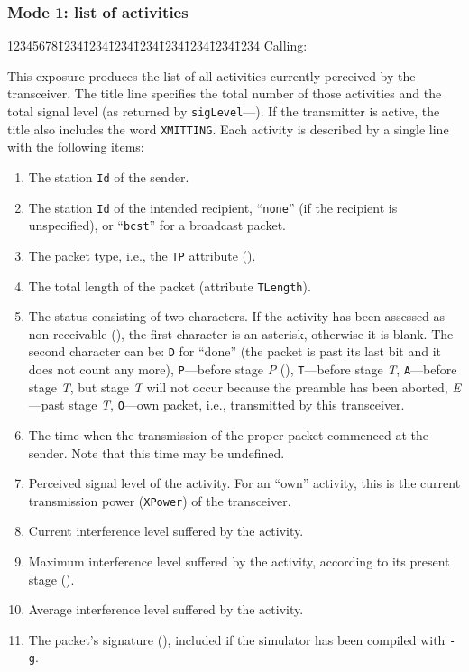 \subsubsection*{Mode 1: list of activities}

{\tt\begin{tabbing}
12345678\=1234\=1234\=1234\=1234\=1234\=1234\=1234\=1234\kill
{\rm Calling:}
\end{tabbing}}

This exposure produces the list of all activities currently perceived by the
transceiver.
The title line specifies the total number of those activities and the total
signal level (as returned by {\tt sigLevel}---).
If the transmitter is active, the title also includes the word
{\tt XMITTING}.
Each activity is described by a single line with the following items:

\begin{enumerate}
\item
The station {\tt Id} of the sender.
\item
The station {\tt Id} of the intended recipient, ``{\tt none}'' (if the recipient
is unspecified), or ``{\tt bcst}'' for a broadcast packet.
\item
The packet type, i.e., the {\tt TP} attribute ().
\item
The total length of the packet (attribute {\tt TLength}).
\item
The status consisting of two characters.
If the activity has been assessed as non-receivable (),
the first character is an asterisk, otherwise it is blank.
The second character can be: {\tt D} for ``done'' (the packet is past its last
bit and it does not count any more), {\tt P}---before stage {\em P\/}
(),
{\tt T}---before stage {\em T}, {\tt A}---before stage {\em T}, but stage
{\em T\/} will not occur because the preamble has been aborted,
{\em E\/}---past stage {\em T}, {\tt O}---own packet, i.e., transmitted by
this transceiver.
\item
The time when the transmission of the proper packet commenced at the sender.
Note that this time may be undefined.
\item
Perceived signal level of the activity.
For an ``own'' activity, this is the current transmission power ({\tt XPower})
of the transceiver.
\item
Current interference level suffered by the activity.
\item
Maximum interference level suffered by the activity, according to its present
stage ().
\item
Average interference level suffered by the activity.
\item
The packet's signature (), included if the simulator
has been compiled with {\tt -g}.
\end{enumerate}

